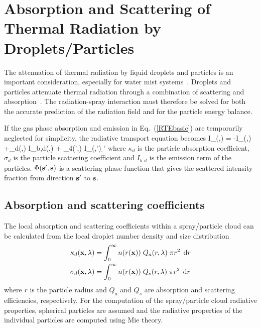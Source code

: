 \section{Absorption and Scattering of Thermal Radiation by Droplets/Particles}
\label{droplet-radiation}

The attenuation of thermal radiation by liquid droplets and particles is an important consideration, especially for water mist
systems~\cite{Ravigururajan:1}.  Droplets and particles attenuate thermal radiation through a combination of scattering and
absorption~\cite{Tuntomo:1}.  The radiation-spray interaction must therefore be solved for both the accurate prediction of the radiation
field and for the particle energy balance.

If the gas phase absorption and emission in Eq.~(\ref{RTEbasic}) are temporarily neglected for simplicity, the radiative transport
equation becomes
\be \bs \cdot \nabla I_{\la}(\bx,\bs) = -
I_{\la}(\bx,\bs) +\kappa_d(\bx,\la) \; I_{b,d}(\bx,\la) +
\int_{4\pi}\Phi(\bs',\bs) \; I_{\la}(\bx,\bs') \; \d\bs'
\label{RTEspray} \ee
where $\kappa_d$ is the particle absorption coefficient, $\sigma_d$ is the
particle scattering coefficient and $I_{b,d}$ is the emission
term of the particles. $\Phi({\bf s}',{\bf s})$ is a scattering phase function
that gives the scattered intensity fraction from direction ${\bf s}'$ to ${\bf s}$.\\

\subsection{Absorption and scattering coefficients}

The local absorption and scattering coefficients within a spray/particle cloud can be calculated
from the local droplet number density and size distribution
\begin{align}
\kappa_d(\bx,\la) &= \int_0^\infty n(r(\bx)) \; Q_a(r,\la) \; \pi r^2 \; \d r \\ %
\sigma_d(\bx,\la) &= \int_0^\infty n(r(\bx)) \; Q_s(r,\la) \; \pi r^2 \; \d r    %
\end{align}
where $r$ is the particle radius and $Q_a$ and $Q_s$ are absorption and
scattering efficiencies, respectively.  For the computation of the spray/particle cloud radiative properties,
spherical particles are assumed and the radiative properties of the individual particles
are computed using Mie theory.

